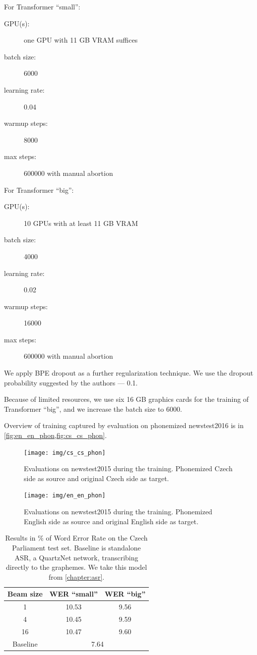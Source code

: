 For Transformer ``small'':
\begin{description}
	\item[GPU(s):] one GPU with 11 GB VRAM suffices
	\item[batch size:] 6000
	\item[learning rate:] 0.04
	\item[warmup steps:] 8000
	\item[max steps:] 600000 with manual abortion
\end{description}

For Transformer ``big'':
\begin{description}
	\item[GPU(s):] 10 GPUs with at least 11 GB VRAM
	\item[batch size:] 4000
	\item[learning rate:] 0.02
	\item[warmup steps:] 16000
	\item[max steps:] 600000 with manual abortion
\end{description}

We apply BPE dropout  as a further regularization technique. We use the dropout probability suggested by the authors --- 0.1.

Because of limited resources, we use six 16 GB graphics cards for the training of Transformer ``big'', and we increase the batch size to 6000.

Overview of training captured by evaluation on phonemized newstest2016 is in \cref{fig:en_en_phon,fig:cs_cs_phon}.

\begin{figure}[h]
	\texttt{[image: img/cs\_cs\_phon]}
	\caption{Evaluations on newstest2015 during the training. Phonemized Czech side as source and original Czech side as target.}
	\label{fig:cs_cs_phon}
\end{figure}



\begin{figure}[h]
	\texttt{[image: img/en\_en\_phon]}
	\caption{Evaluations on newstest2015 during the training. Phonemized English side as source and original English side as target.}
	\label{fig:en_en_phon}
\end{figure}




\begin{table}[h]
	\centering
	\begin{tabular}{c|cc}
		\bf Beam size & \bf WER ``small''& \bf WER ``big'' \\
		\hline
		1    &    10.53 & 9.56    \\
		4    &    10.45& 9.59    \\
		16    &    10.47& 9.60\\
		Baseline & \multicolumn{2}{c}{7.64} 
		
	\end{tabular}
	
	\caption{Results in \% of Word Error Rate on the Czech Parliament test set. Baseline is standalone ASR, a QuartzNet network, transcribing directly to the graphemes. We take this model from \cref{chapter:asr}.}
	\label{tab:phon_cs}
\end{table}


